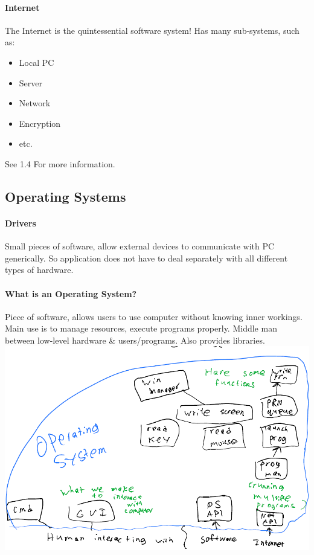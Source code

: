 \documentclass[12 pt]{article}
\begin{document}
	\paragraph{Internet} The Internet is the quintessential software system! Has many sub-systems, such as:
	\begin{itemize}
		\item Local PC
		\item Server
		\item Network
		\item Encryption
		\item etc.
	\end{itemize} See 1.4 For more information.
	\subsection{Operating Systems}
	\paragraph{Drivers} Small pieces of software, allow external devices to communicate with PC generically. So application does not have to deal separately with all different types of hardware.
	\paragraph{What is an Operating System?} Piece of software, allows users to use computer without knowing inner workings. Main use is to manage resources, execute programs properly. Middle man between low-level hardware \& users/programs. Also provides libraries.
	\includegraphics[scale=0.5]{os}
\end{document}
